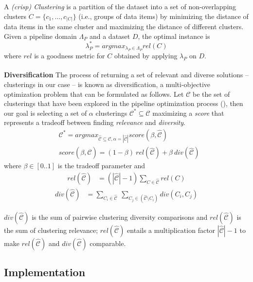 \documentclass[runningheads]{llncs}
\begin{document}
A \textit{(crisp) Clustering} is a partition of the dataset into a set of non-overlapping clusters  $C=\{c_1, \ldots, c_{|C|}\}$ (i.e., groups of data items) by minimizing the distance of data items in the same cluster and maximizing the distance of different clusters. 
Given a pipeline domain $\Lambda_P$ and a dataset $D$, the optimal instance is 
\begin{equation}
\label{eq:optimization}
    \lambda_P^* = argmax_{\lambda_P \in \Lambda_P} rel(C)
\end{equation}
where $rel$ is a goodness metric for $C$ obtained by applying $\lambda_P$ on $D$.
\\
\\
\textbf{Diversification} The process of returning a set of relevant and diverse solutions -- clusterings in our case -- is known as diversification, a multi-objective optimization problem that can be formulated as follows.
%
Let $\mathcal{C}$ be the set of clusterings that have been explored in the pipeline optimization process (), then our goal is selecting a set of $\alpha$ clusterings $\mathcal{C}^* \subseteq \mathcal{C}$ maximizing a \textit{score} that represents a tradeoff between finding \textit{relevance} and \textit{diversity}.
%
\begin{align}\label{def:score}
&\mathcal{C}^* = argmax_{\hat{\mathcal{C}} \subseteq \mathcal{C}, \alpha=|\hat{\mathcal{C}}|} score(\beta, \hat{\mathcal{C}})\\
&score(\beta, \hat{\mathcal{C}}) = (1-\beta)~rel(\hat{\mathcal{C}}) + \beta~div(\hat{\mathcal{C}})
\end{align}
where $\beta \in [0.. 1]$ is the tradeoff parameter and
\begin{align}
rel(\hat{\mathcal{C}}) &= (|\hat{\mathcal{C}}|-1)\sum_{C \in \hat{\mathcal{C}}} rel(C)
\label{def:rel}
\end{align}
\begin{align}
div(\hat{\mathcal{C}}) &= \sum_{C_i \in \hat{\mathcal{C}}}~\sum_{C_j \in (\hat{\mathcal{C}} \setminus C_i)} div(C_i, C_j)
\label{def:div}
\end{align}

\noindent $div(\hat{\mathcal{C}})$ is the sum of pairwise clustering diversity comparisons and $rel(\hat{\mathcal{C}})$ is the sum of clustering relevance;
$rel(\hat{\mathcal{C}})$ entails a multiplication factor $|\hat{\mathcal{C}}|-1$ to make $rel(\hat{\mathcal{C}})$ and $div(\hat{\mathcal{C}})$ comparable.

\subsection{Implementation}\label{sec:implementation}
\end{document}
